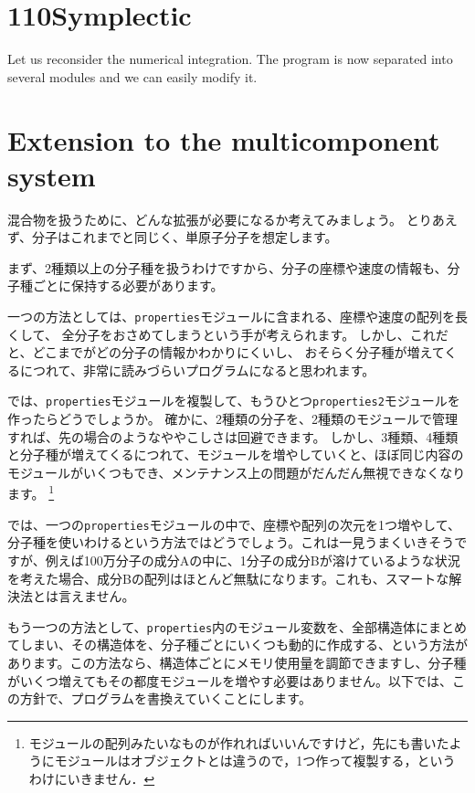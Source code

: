 \documentclass[a4,10pt]{article}
\begin{document}
\section{110Symplectic}

Let us reconsider the numerical integration.  The program is now separated into several modules and we can easily modify it.

\section{Extension to the multicomponent system}

混合物を扱うために、どんな拡張が必要になるか考えてみましょう。
とりあえず、分子はこれまでと同じく、単原子分子を想定します。

まず、2種類以上の分子種を扱うわけですから、分子の座標や速度の情報も、分子種ごとに保持する必要があります。

一つの方法としては、{\tt properties}モジュールに含まれる、座標や速度の配列を長くして、
全分子をおさめてしまうという手が考えられます。
しかし、これだと、どこまでがどの分子の情報かわかりにくいし、
おそらく分子種が増えてくるにつれて、非常に読みづらいプログラムになると思われます。

では、{\tt properties}モジュールを複製して、もうひとつ{\tt properties2}モジュールを作ったらどうでしょうか。
確かに、2種類の分子を、2種類のモジュールで管理すれば、先の場合のようなややこしさは回避できます。
しかし、3種類、4種類と分子種が増えてくるにつれて、モジュールを増やしていくと、ほぼ同じ内容の
モジュールがいくつもでき、メンテナンス上の問題がだんだん無視できなくなります。
\footnote{モジュールの配列みたいなものが作れればいいんですけど，先にも書いたようにモジュールはオブジェクトとは違うので，1つ作って複製する，というわけにいきません．}

では、一つの{\tt properties}モジュールの中で、座標や配列の次元を1つ増やして、分子種を使いわけるという方法ではどうでしょう。これは一見うまくいきそうですが、例えば100万分子の成分Aの中に、1分子の成分Bが溶けているような状況を考えた場合、成分Bの配列はほとんど無駄になります。これも、スマートな解決法とは言えません。

もう一つの方法として、{\tt properties}内のモジュール変数を、全部構造体にまとめてしまい、その構造体を、分子種ごとにいくつも動的に作成する、という方法があります。この方法なら、構造体ごとにメモリ使用量を調節できますし、分子種がいくつ増えてもその都度モジュールを増やす必要はありません。以下では、この方針で、プログラムを書換えていくことにします。
\end{document}
